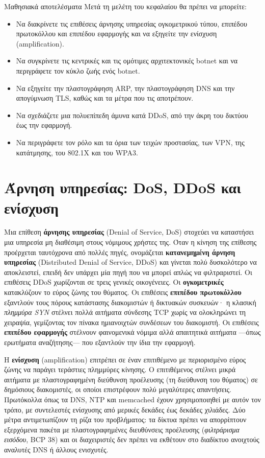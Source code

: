 \documentclass[11pt,openany]{book}
\begin{document}
\begin{outcomesbox}{Μαθησιακά αποτελέσματα}
Μετά τη μελέτη του κεφαλαίου θα πρέπει να μπορείτε:
\begin{itemize}
  \item Να διακρίνετε τις επιθέσεις άρνησης υπηρεσίας ογκομετρικού τύπου, επιπέδου πρωτοκόλλου και επιπέδου εφαρμογής και να εξηγείτε την ενίσχυση (amplification).
  \item Να συγκρίνετε τις κεντρικές και τις ομότιμες αρχιτεκτονικές botnet και να περιγράφετε τον κύκλο ζωής ενός botnet.
  \item Να εξηγείτε την πλαστογράφηση ARP, την πλαστογράφηση DNS και την απογύμνωση TLS, καθώς και τα μέτρα που τις αποτρέπουν.
  \item Να σχεδιάζετε μια πολυεπίπεδη άμυνα κατά DDoS, από την άκρη του δικτύου έως την εφαρμογή.
  \item Να περιγράφετε τον ρόλο και τα όρια των τειχών προστασίας, των VPN, της κατάτμησης, του 802.1X και του WPA3.
\end{itemize}
\end{outcomesbox}

\section{Άρνηση υπηρεσίας: DoS, DDoS και ενίσχυση}\label{sec:6.1}
Μια επίθεση \textbf{άρνησης υπηρεσίας} (Denial of Service, DoS) στοχεύει να καταστήσει μια υπηρεσία μη διαθέσιμη στους νόμιμους χρήστες της. Όταν η κίνηση της επίθεσης προέρχεται ταυτόχρονα από πολλές πηγές, ονομάζεται \textbf{κατανεμημένη άρνηση υπηρεσίας} (Distributed Denial of Service, DDoS) και γίνεται πολύ δυσκολότερο να αποκλειστεί, επειδή δεν υπάρχει μία πηγή που να μπορεί απλώς να φιλτραριστεί. Οι επιθέσεις DDoS χωρίζονται σε τρεις γενικές οικογένειες. Οι \textbf{ογκομετρικές} κατακλύζουν το εύρος ζώνης του θύματος. Οι επιθέσεις \textbf{επιπέδου πρωτοκόλλου} εξαντλούν τους πόρους κατάστασης διακομιστών ή δικτυακών συσκευών· η κλασική \emph{πλημμύρα SYN} στέλνει πολλά αιτήματα σύνδεσης TCP χωρίς να ολοκληρώνει τη χειραψία, γεμίζοντας τον πίνακα ημιανοιχτών συνδέσεων του διακομιστή. Οι επιθέσεις \textbf{επιπέδου εφαρμογής} στέλνουν φαινομενικά νόμιμα αλλά απαιτητικά αιτήματα —όπως ερωτήματα αναζήτησης— που εξαντλούν την ίδια την εφαρμογή.

Η \textbf{ενίσχυση} (amplification) επιτρέπει σε έναν επιτιθέμενο με περιορισμένο εύρος ζώνης να παράγει τεράστιες πλημμύρες κίνησης. Ο επιτιθέμενος στέλνει μικρά αιτήματα με πλαστογραφημένη διεύθυνση προέλευσης (τη διεύθυνση του θύματος) σε δημόσιους διακομιστές, οι οποίοι επιστρέφουν πολύ μεγαλύτερες απαντήσεις. Πρωτόκολλα όπως τα DNS, NTP και memcached έχουν χρησιμοποιηθεί με αυτόν τον τρόπο, με συντελεστές ενίσχυσης από μερικές δεκάδες έως δεκάδες χιλιάδες. Δύο μέτρα αντιμετωπίζουν τη ρίζα του προβλήματος: τα δίκτυα πρέπει να απορρίπτουν εξερχόμενα πακέτα με πλαστογραφημένες διευθύνσεις προέλευσης (\emph{φιλτράρισμα εισόδου}, BCP 38) και οι διαχειριστές δεν πρέπει να εκθέτουν στο διαδίκτυο ανοιχτούς αναλυτές DNS ή άλλους ενισχυτές.
\end{document}
